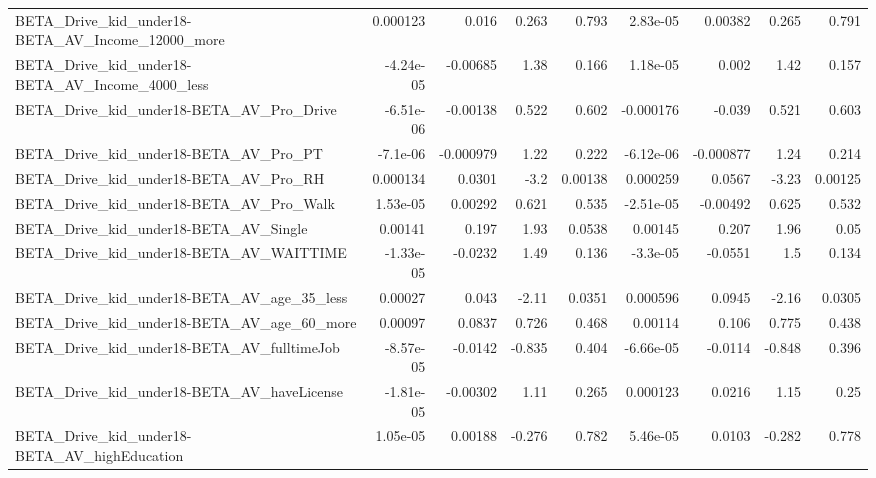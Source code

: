 \begin{tabular}{lrrrrrrrr}
BETA\_Drive\_kid\_under18-BETA\_AV\_Income\_12000\_more   &    0.000123 &        0.016 &     0.263 &    0.793 &   2.83e-05 &     0.00382 &        0.265 &         0.791 \\
BETA\_Drive\_kid\_under18-BETA\_AV\_Income\_4000\_less    &   -4.24e-05 &     -0.00685 &      1.38 &    0.166 &   1.18e-05 &       0.002 &         1.42 &         0.157 \\
BETA\_Drive\_kid\_under18-BETA\_AV\_Pro\_Drive           &   -6.51e-06 &     -0.00138 &     0.522 &    0.602 &  -0.000176 &      -0.039 &        0.521 &         0.603 \\
BETA\_Drive\_kid\_under18-BETA\_AV\_Pro\_PT              &    -7.1e-06 &    -0.000979 &      1.22 &    0.222 &  -6.12e-06 &   -0.000877 &         1.24 &         0.214 \\
BETA\_Drive\_kid\_under18-BETA\_AV\_Pro\_RH              &    0.000134 &       0.0301 &      -3.2 &  0.00138 &   0.000259 &      0.0567 &        -3.23 &       0.00125 \\
BETA\_Drive\_kid\_under18-BETA\_AV\_Pro\_Walk            &    1.53e-05 &      0.00292 &     0.621 &    0.535 &  -2.51e-05 &    -0.00492 &        0.625 &         0.532 \\
BETA\_Drive\_kid\_under18-BETA\_AV\_Single              &     0.00141 &        0.197 &      1.93 &   0.0538 &    0.00145 &       0.207 &         1.96 &          0.05 \\
BETA\_Drive\_kid\_under18-BETA\_AV\_WAITTIME            &   -1.33e-05 &      -0.0232 &      1.49 &    0.136 &   -3.3e-05 &     -0.0551 &          1.5 &         0.134 \\
BETA\_Drive\_kid\_under18-BETA\_AV\_age\_35\_less         &     0.00027 &        0.043 &     -2.11 &   0.0351 &   0.000596 &      0.0945 &        -2.16 &        0.0305 \\
BETA\_Drive\_kid\_under18-BETA\_AV\_age\_60\_more         &     0.00097 &       0.0837 &     0.726 &    0.468 &    0.00114 &       0.106 &        0.775 &         0.438 \\
BETA\_Drive\_kid\_under18-BETA\_AV\_fulltimeJob         &   -8.57e-05 &      -0.0142 &    -0.835 &    0.404 &  -6.66e-05 &     -0.0114 &       -0.848 &         0.396 \\
BETA\_Drive\_kid\_under18-BETA\_AV\_haveLicense         &   -1.81e-05 &     -0.00302 &      1.11 &    0.265 &   0.000123 &      0.0216 &         1.15 &          0.25 \\
BETA\_Drive\_kid\_under18-BETA\_AV\_highEducation       &    1.05e-05 &      0.00188 &    -0.276 &    0.782 &   5.46e-05 &      0.0103 &       -0.282 &         0.778 \\

\end{tabular}
